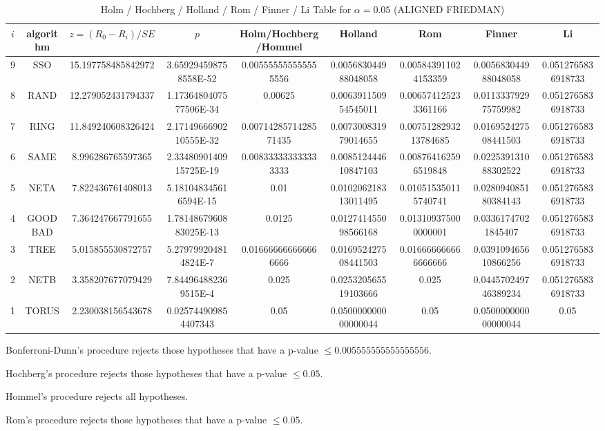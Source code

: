 \documentclass[a4paper,10pt]{article}
\begin{document}
\begin{landscape}
\newpage

\begin{table}[!htp]
\centering\scriptsize
\caption{Holm / Hochberg / Holland / Rom / Finner / Li Table for $\alpha=0.05$ (ALIGNED FRIEDMAN)}
\begin{tabular}{ccccccccc}
$i$&algorithm&$z=(R_0 - R_i)/SE$&$p$&Holm/Hochberg/Hommel&Holland&Rom&Finner&Li\\
\hline
9& SSO&15.197758485842972&3.659294598758558E-52&0.005555555555555556&0.005683044988048058&0.005843911024153359&0.005683044988048058&0.0512765836918733\\
8& RAND&12.279052431794337&1.1736480407577506E-34&0.00625&0.006391150954545011&0.006574125233361166&0.011333792975759982&0.0512765836918733\\
7& RING&11.849240608326424&2.1714966690210555E-32&0.0071428571428571435&0.007300831979014655&0.0075128293213784685&0.016952427508441503&0.0512765836918733\\
6& SAME&8.996286765597365&2.3348090140915725E-19&0.008333333333333333&0.008512444610847103&0.008764162596519848&0.022539131088302522&0.0512765836918733\\
5& NETA&7.822436761408013&5.181048345616594E-15&0.01&0.010206218313011495&0.010515350115740741&0.028094085180384143&0.0512765836918733\\
4& GOODBAD&7.364247667791655&1.7814867960883025E-13&0.0125&0.012741455098566168&0.013109375000000001&0.03361747021845407&0.0512765836918733\\
3& TREE&5.015855530872757&5.279799204814824E-7&0.016666666666666666&0.016952427508441503&0.016666666666666666&0.039109465610866256&0.0512765836918733\\
2& NETB&3.358207677079429&7.844964882369515E-4&0.025&0.025320565519103666&0.025&0.044570249746389234&0.0512765836918733\\
1& TORUS&2.230038156543678&0.025744909854407343&0.05&0.050000000000000044&0.05&0.050000000000000044&0.05\\
\hline
\end{tabular}
\end{table}
Bonferroni-Dunn's procedure rejects those hypotheses that have a p-value $\le0.005555555555555556$.


Hochberg's procedure rejects those hypotheses that have a p-value $\le0.05$.


Hommel's procedure rejects all hypotheses.


Rom's procedure rejects those hypotheses that have a p-value $\le0.05$.



\end{landscape}
\end{document}
